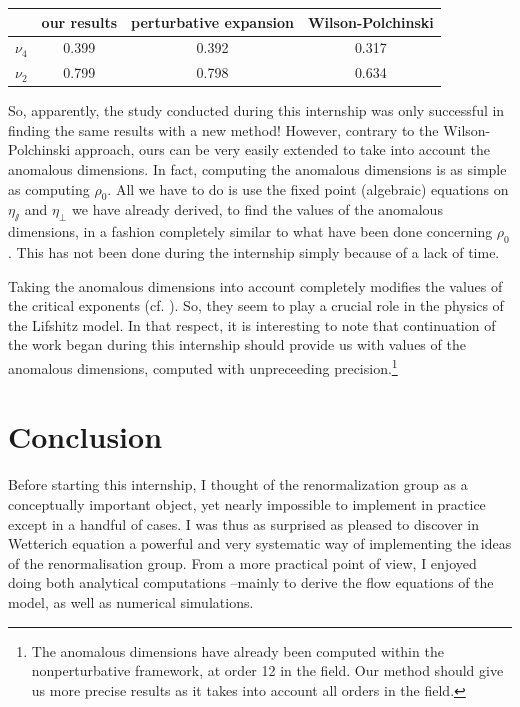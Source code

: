 \begin{center}
\label{tab:results}
\begin{tabular}{|c|c|c|c|}
\hline 
\rule[-1ex]{0pt}{2.5ex} ~ & our results & perturbative expansion & Wilson-Polchinski \\ 
\hline 
\rule[-1ex]{0pt}{2.5ex} $\nu_4$ & 0.399 & 0.392 & 0.317 \\ 
\hline 
\rule[-1ex]{0pt}{2.5ex} $\nu_2$ & 0.799 & 0.798 & 0.634 \\ 
\hline 
\end{tabular} 
\end{center}

So, apparently, the study conducted during this internship was only successful in finding the same results with a new method!
However, contrary to the Wilson-Polchinski approach, ours can be very easily extended to take into account the anomalous dimensions. In fact, computing the anomalous dimensions is as simple as computing $\rho_0$. All we have to do is use the fixed point (algebraic) equations on $\eta_\sslash$ and $\eta_\perp$ we have already derived, to find the values of the anomalous dimensions, in a fashion completely similar to what have been done concerning $\rho_0$. This has not been done during the internship simply because of a lack of time.

Taking the anomalous dimensions into account completely modifies the values of the critical exponents (cf. \cite{MouhannaLif}). So, they seem to play a crucial role in the physics of the Lifshitz model. 
In that respect, it is interesting to note that continuation of the work began during this internship should provide us with values of the anomalous dimensions, computed with unpreceeding precision.\footnote{The anomalous dimensions have already been computed within the nonperturbative framework, at order 12 in the field. Our method should give us more precise results as it takes into account all orders in the field.}


\section*{\huge{Conclusion}}

Before starting this internship, I thought of the renormalization group as a conceptually important object, yet nearly impossible to implement in practice except in a handful of cases. 
I was thus as surprised as pleased to discover in Wetterich equation a powerful and very systematic way of implementing the ideas of the renormalisation group. 
From a more practical point of view, I enjoyed doing both analytical computations --mainly to derive the flow equations of the model, as well as numerical simulations.


